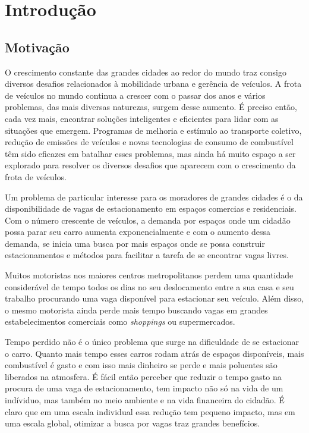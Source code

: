 \chapter{Introdução} \label{introducao}


\section{Motivação} \label{motivacao}
    O crescimento constante das grandes cidades ao redor do mundo traz consigo diversos desafios relacionados à mobilidade urbana e gerência de veículos. A frota de veículos no mundo continua a crescer com o passar dos anos e vários problemas, das mais diversas naturezas, surgem desse aumento. É preciso então, cada vez mais, encontrar soluções inteligentes e eficientes para lidar com as situações que emergem. Programas de melhoria e estímulo ao transporte coletivo, redução de emissões de veículos e novas tecnologias de consumo de combustível têm sido eficazes em batalhar esses problemas, mas ainda há muito espaço a ser explorado para resolver os diversos desafios que aparecem com o crescimento da frota de veículos.

    Um problema de particular interesse para os moradores de grandes cidades é o da disponibilidade de vagas de estacionamento em espaços comercias e residenciais. Com o número crescente de veículos, a demanda por espaços onde um cidadão possa parar seu carro aumenta exponencialmente e com o aumento dessa demanda, se inicia uma busca por mais espaços onde se possa construir estacionamentos e métodos para facilitar a tarefa de se encontrar vagas livres.

    Muitos motoristas nos maiores centros metropolitanos perdem uma quantidade considerável de tempo todos os dias no seu deslocamento entre a sua casa e seu trabalho procurando uma vaga disponível para estacionar seu veículo. Além disso, o mesmo motorista ainda perde mais tempo buscando vagas em grandes estabelecimentos comerciais como \textit{shoppings} ou supermercados.

    Tempo perdido não é o único problema que surge na dificuldade de se estacionar o carro. Quanto mais tempo esses carros rodam atrás de espaços disponíveis, mais combustível é gasto e com isso mais dinheiro se perde e  mais poluentes são liberados na atmosfera. É fácil então perceber que reduzir o tempo gasto na procura de uma vaga de estacionamento, tem impacto não só na vida de um indíviduo, mas também no meio ambiente e na vida financeira do cidadão. É claro que em uma escala individual essa redução tem pequeno impacto, mas em uma escala global, otimizar a busca por vagas traz grandes benefícios.

